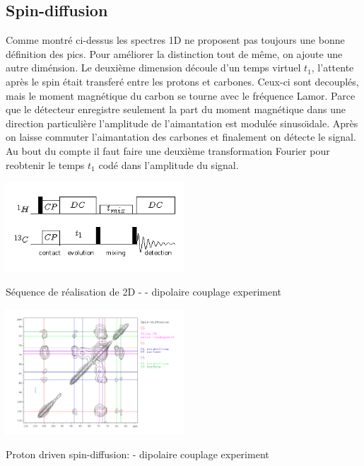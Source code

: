 \documentclass[a4paper,12pt]{scrartcl}
\begin{document}
  \subsection{Spin-diffusion}
Comme montré ci-dessus les spectres 1D ne proposent pas toujours une bonne définition des pics. Pour améliorer la distinction tout de même, on ajoute une autre diménsion. Le deuxième dimension découle d'un temps virtuel $t_1$, l'attente après le spin était transferé entre les protons et carbones. Ceux-ci sont decouplés, mais le moment magnétique du carbon se tourne avec le fréquence Lamor. Parce que le détecteur enregistre seulement la part du moment magnétique dans une direction particulière l'amplitude de l'aimantation est modulée sinuso\"{\i}dale. Après on laisse commuter l'aimantation des carbones et finalement on détecte le signal. Au bout du compte il faut faire une deuxième transformation Fourier pour reobtenir le temps $t_1$ codé dans l'amplitude du signal.
\begin{figurehere}
    \center
     \includegraphics[width=0.5\textwidth]{bilder/PDSD2.png}
     \caption{Séquence de réalisation de 2D -  -  dipolaire couplage experiment}
    \end{figurehere}
\begin{figurehere}
    \center
    \includegraphics[width=0.5\textwidth]{bilder/spin_diff.png}
    \caption{Proton driven spin-diffusion:  -  dipolaire couplage experiment}
   \end{figurehere}
\end{document}
